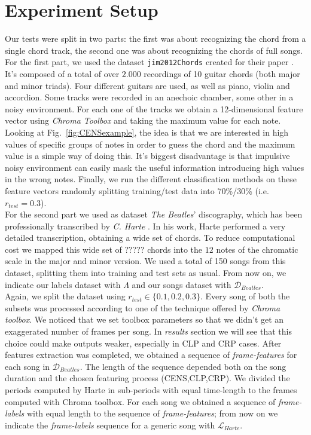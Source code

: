 \section{Experiment Setup}
\label{sec:setup}

Our tests were split in two parts: the first was about recognizing the chord from a single chord track, the second one was about recognizing the chords of full songs.\\
%
For the first part, we used the dataset \texttt{jim2012Chords} \cite{jim2012Chords} created for their paper \cite{JimChordsPaper}. It's composed of a total of over $2.000$ recordings of 10 guitar chords (both major and minor triads). Four different guitars are used, as well as piano, violin and accordion. Some tracks were recorded in an anechoic chamber, some other in a noisy environment. For each one of the tracks we obtain a 12-dimensional feature vector using \textit{Chroma Toolbox} and taking the maximum value for each note. Looking at Fig.~\ref{fig:CENSexample}, the idea is that we are interested in high values of specific groups of notes in order to guess the chord and the maximum value is a simple way of doing this. It's biggest disadvantage is that impulsive noisy environment can easily mask the useful information introducing high values in the wrong notes. Finally, we run the different classification methods on these feature vectors randomly splitting training/test data into 70\%/30\% (i.e. $r_{test}=0.3$).\\
%
For the second part we used as dataset \textit{The Beatles}' discography, which has been professionally transcribed by \textit{C. Harte} \cite{HartePaper}\cite{HarteThesis}. In his work, Harte performed a very detailed transcription, obtaining a wide set of chords. To reduce computational cost we mapped this wide set of ????? chords into the $12$ notes of the chromatic scale in the major and minor version. We used a total of 150 songs from this dataset, splitting them into training and test sets as usual. From now on, we indicate our labels dataset with $\Lambda$ and our songs dataset with $\mathcal{D}_{Beatles}$. \\
%
Again, we split the dataset using $r_{test}\in \{0.1,0.2,0.3\}$. Every song of both the subsets was processed according to one of the technique offered by \textit{Chroma toolbox}. We noticed that we set toolbox parameters so that we didn't get an exaggerated number of frames per song. In \textit{results} section we will see that this choice could make outputs weaker, especially in CLP and CRP cases. After features extraction was completed, we obtained a sequence of \textit{frame-features} for each song in $\mathcal{D}_{Beatles}$. The length of the sequence depended both on the song duration and the chosen featuring process (CENS,CLP,CRP). We divided the periods computed by Harte in sub-periods with equal time-length to the frames computed with Chroma toolbox. For each song we obtained a sequence of \textit{frame-labels} with equal length to the sequence of \textit{frame-features}; from now on we indicate the \textit{frame-labels} sequence for a generic song with $\mathcal{L}_{Harte}$.
